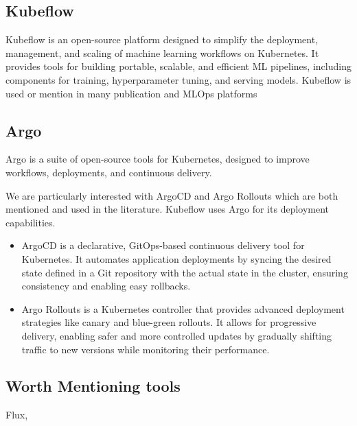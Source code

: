 \cite{10245408}

\subsection{Kubeflow}
Kubeflow\cite{Kubeflow} is an open-source platform designed to simplify the deployment, management, and scaling of machine learning workflows on Kubernetes.
It provides tools for building portable, scalable, and efficient ML pipelines, including components for training, hyperparameter tuning, and serving models.
Kubeflow is used or mention in many publication and MLOps platforms\cite{inproceedings,10855428}

\subsection{Argo}
Argo\cite{argo} is a suite of open-source tools for Kubernetes, designed to improve workflows, deployments, and continuous delivery.

We are particularly interested with ArgoCD and Argo Rollouts which are both mentioned and used in the literature.
Kubeflow uses Argo for its deployment capabilities.

\begin{itemize}
    \item ArgoCD
     is a declarative, GitOps-based continuous delivery tool for Kubernetes.
     It automates application deployments by syncing the desired state
    defined in a Git repository with the actual state in the cluster,
    ensuring consistency and enabling easy rollbacks.

    \item Argo Rollouts
     is a Kubernetes controller that provides advanced deployment strategies
     like canary and blue-green rollouts. It allows for progressive
    delivery, enabling safer and more controlled updates by gradually
    shifting traffic to new versions while monitoring their performance.
\end{itemize}


\subsection{Worth Mentioning tools}
Flux,